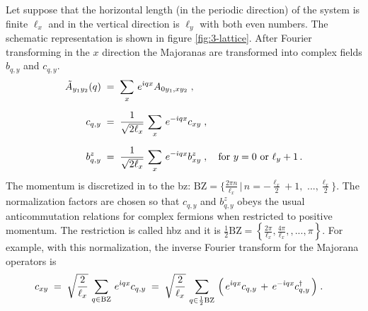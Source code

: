 Let suppose that the horizontal length (in the periodic direction) of the system is finite $\ell_x$ and in the vertical direction is $\ell_y$ with both even numbers.  The schematic representation is shown in  figure \ref{fig:3-lattice}.  After Fourier transforming in the $x$ direction the Majoranas are transformed into complex fields $b_{q , y}$ and $c_{q,y}$. %
\begin{align}
     \tilde{A}_{y_1y_2}(q)  \; &= \;  \sum_{x} \, e^{\dot{\imath} qx} A_{0y_1,xy_2} \; \label{eq:3-fourier-t} , \\[6pt]
    c_{q,y} \; &= \; \frac{1}{\sqrt{2\ell_x}} \, \sum_{x} \, e^{- \dot{\imath} q x} c_{xy} \; ,  \label{eq:3-fourier-t-c}  \\[6pt]
    b^{z}_{q,y} \; &= \; \frac{1}{\sqrt{2\ell_x}} \, \sum_{x} \, e^{- \dot{\imath} q x} b^{z}_{xy} \; , \quad \text{for } y = 0 \text{ or } \ell_{y}+1 \, .
\end{align}
The momentum is discretized in to the \acrlong{bz}: $\text{BZ}= \big\{  \frac{2\pi n}{\ell_x} \, \Big\vert \,  n = -\frac{\ell_x}{2}+1 , $ $...,\frac{\ell_x}{2} \big\}$. The normalization factors are chosen so that $c_{q,y}$ and $ b^{z}_{q,y}$ obeys the usual anticommutation relations for complex fermions when restricted to positive momentum. The restriction is called \acrfull{hbz} and it is $\frac{1}{2}\text{BZ}= \left\{  \frac{2\pi}{\ell_x}, \frac{4\pi}{\ell_x}, ,...,\pi  \right\}$. For example, with this normalization, the inverse Fourier transform for the Majorana operators is
\begin{align}
    c_{xy} \; &= \; \sqrt{\frac{2}{\ell_x}} \, \sum_{q \in \text{BZ}} \, e^{\dot{\imath} q x} c_{q,y}  \; = \;  \sqrt{\frac{2}{\ell_x}} \, \sum_{q \in \frac{1}{2}\text{BZ}} \, \Big( \,e^{\dot{\imath} q x} c_{q,y} \, + \, e^{-\dot{\imath} q x} c_{q,y}^{\dagger} \, \Big)\; . \label{eq:3-inverse-fourier}
\end{align}


